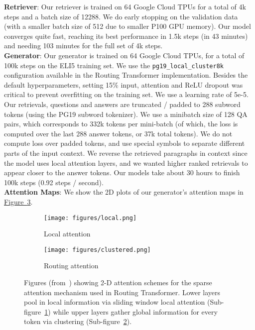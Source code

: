 \documentclass[11pt]{article}
\newcommand{\namedref}[2]{\hyperref[#2]{#1~\ref*{#2}}}
\newcommand{\figureref}[1]{\namedref{Figure}{#1}}
\begin{document}
\noindent \textbf{Retriever}: Our retriever is trained on 64 Google Cloud TPUs for a total of 4k steps and a batch size of 12288. We do early stopping on the validation data (with a smaller batch size of 512 due to smaller P100 GPU memory). Our model converges quite fast, reaching its best performance in 1.5k steps (in 43 minutes) and needing 103 minutes for the full set of 4k steps.\\

\noindent \textbf{Generator}: Our generator is trained on 64 Google Cloud TPUs, for a total of 100k steps on the ELI5 training set. We use the \texttt{pg19\_local\_cluster8k} configuration available in the Routing Transformer implementation. Besides the default hyperparameters, setting 15\% input, attention and ReLU dropout was critical to prevent overfitting on the training set. We use a learning rate of 5e-5. Our retrievals, questions and answers are truncated / padded to 288 subword tokens (using the PG19 subword tokenizer). We use a minibatch size of 128 QA pairs, which corresponds to 332k tokens per mini-batch (of which, the loss is computed over the last 288 answer tokens, or 37k total tokens). We do not compute loss over padded tokens, and use special symbols to separate different parts of the input context. We reverse the retrieved paragraphs in context since the model uses local attention layers, and we wanted higher ranked retrievals to appear closer to the answer tokens. Our models take about 30 hours to finish 100k steps (0.92 steps / second).\\

\noindent \textbf{Attention Maps}: We show the 2D plots of our generator's attention maps in \figureref{fig:attention}.

\begin{figure}[h]
\begin{subfigure}{.24\textwidth}
  \centering
  \texttt{[image: figures/local.png]}
  \caption{Local attention}
  \label{fig:sfig1}
\end{subfigure}\begin{subfigure}{.24\textwidth}
  \centering
  \texttt{[image: figures/clustered.png]}
  \caption{Routing attention}
  \label{fig:sfig3}
\end{subfigure}
\caption{Figures (from~\citealp{roy2020efficient}) showing 2-D attention schemes for the sparse attention mechanism used in
Routing Transformer. Lower layers pool in local information via sliding window local attention
(Sub-figure~\ref{fig:sfig1}) while upper layers gather global information for every token via clustering (Sub-figure~\ref{fig:sfig3}).}
\label{fig:attention}
\end{figure}
\end{document}
